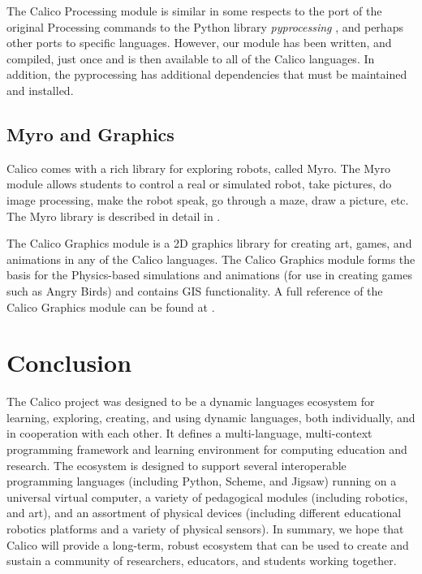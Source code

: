 \documentclass[preprint]{sigplanconf}
\begin{document}
The Calico Processing module is similar in some respects to the port
of the original Processing commands to the Python library
\textit{pyprocessing} \cite{pyprocessing}, and perhaps other ports to
specific languages. However, our module has been written, and
compiled, just once and is then available to all of the Calico
languages. In addition, the pyprocessing has additional dependencies
that must be maintained and installed.

\subsection{Myro and Graphics}

Calico comes with a rich library for exploring robots, called
Myro. The Myro module allows students to control a real or simulated
robot, take pictures, do image processing, make the robot speak, go
through a maze, draw a picture, etc. The Myro library is described in
detail in \cite{blank-etal-2012}.

The Calico Graphics module is a 2D graphics library for creating art,
games, and animations in any of the Calico languages. The Calico
Graphics module forms the basis for the Physics-based simulations and
animations (for use in creating games such as Angry Birds) and
contains GIS functionality. A full reference of the Calico Graphics
module can be found at \cite{calico-graphics}.

\section{Conclusion}

The Calico project was designed to be a dynamic languages ecosystem
for learning, exploring, creating, and using dynamic languages, both
individually, and in cooperation with each other. It defines a
multi-language, multi-context programming framework and learning
environment for computing education and research. The ecosystem is
designed to support several interoperable programming languages
(including Python, Scheme, and Jigsaw) running on a universal virtual
computer, a variety of pedagogical modules (including robotics, and
art), and an assortment of physical devices (including different
educational robotics platforms and a variety of physical sensors). In
summary, we hope that Calico will provide a long-term, robust
ecosystem that can be used to create and sustain a community of
researchers, educators, and students working together.

\end{document}
